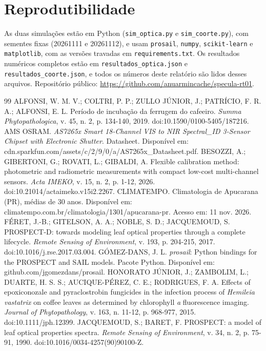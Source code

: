 \documentclass[11pt,a4paper]{article}
\begin{document}
\section{Reprodutibilidade}
\sloppy As duas simulações estão em Python (\texttt{sim\_optica.py} e \texttt{sim\_coorte.py}), com sementes fixas (20261111 e 20261112), e usam \texttt{prosail}, \texttt{numpy}, \texttt{scikit-learn} e \texttt{matplotlib}, com as versões travadas em \texttt{requirements.txt}. Os resultados numéricos completos estão em \texttt{resultados\_optica.json} e \texttt{resultados\_coorte.json}, e todos os números deste relatório são lidos desses arquivos. Repositório público: \url{https://github.com/anuarmincache/specula-rt01}.

\begin{thebibliography}{99}\small
{} ALFONSI, W. M. V.; COLTRI, P. P.; ZULLO JÚNIOR, J.; PATRÍCIO, F. R. A.; ALFONSI, E. L. Período de incubação da ferrugem do cafeeiro. \textit{Summa Phytopathologica}, v. 45, n. 2, p. 134-140, 2019. doi:10.1590/0100-5405/187216.
 AMS OSRAM. \textit{AS7265x Smart 18-Channel VIS to NIR Spectral\_ID 3-Sensor Chipset with Electronic Shutter}. Datasheet. Disponível em: cdn.sparkfun.com/assets/c/2/9/0/a/AS7265x\_Datasheet.pdf.
 BESOZZI, A.; GIBERTONI, G.; ROVATI, L.; GIBALDI, A. Flexible calibration method: photometric and radiometric measurements with compact low-cost multi-channel sensors. \textit{Acta IMEKO}, v. 15, n. 2, p. 1-12, 2026. doi:10.21014/actaimeko.v15i2.2267.
 CLIMATEMPO. Climatologia de Apucarana (PR), médias de 30 anos. Disponível em: climatempo.com.br/climatologia/1301/apucarana-pr. Acesso em: 11 nov. 2026.
 FÉRET, J.-B.; GITELSON, A. A.; NOBLE, S. D.; JACQUEMOUD, S. PROSPECT-D: towards modeling leaf optical properties through a complete lifecycle. \textit{Remote Sensing of Environment}, v. 193, p. 204-215, 2017. doi:10.1016/j.rse.2017.03.004.
 GÓMEZ-DANS, J. L. \textit{prosail}: Python bindings for the PROSPECT and SAIL models. Pacote Python. Disponível em: github.com/jgomezdans/prosail.
 HONORATO JÚNIOR, J.; ZAMBOLIM, L.; DUARTE, H. S. S.; AUCIQUE-PÉREZ, C. E.; RODRIGUES, F. A. Effects of epoxiconozale and pyraclostrobin fungicides in the infection process of \textit{Hemileia vastatrix} on coffee leaves as determined by chlorophyll \textit{a} fluorescence imaging. \textit{Journal of Phytopathology}, v. 163, n. 11-12, p. 968-977, 2015. doi:10.1111/jph.12399.
 JACQUEMOUD, S.; BARET, F. PROSPECT: a model of leaf optical properties spectra. \textit{Remote Sensing of Environment}, v. 34, n. 2, p. 75-91, 1990. doi:10.1016/0034-4257(90)90100-Z.

\end{thebibliography}
\end{document}

